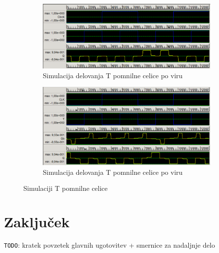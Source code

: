 \documentclass[a4paper, 11pt]{article}
\newcommand{\todo}{\textcolor{BrickRed}{\texttt{TODO}}} %
\begin{document}
\begin{figure}[h!]
	\begin{subfigure}[b]{\textwidth}
	\includegraphics[width=\textwidth]{../img/vir_4/sim_t.png}
	\caption{Simulacija delovanja T pomnilne celice po viru \cite{quantum_dot}}
	\label{fig-t-1-sim}
	\end{subfigure}
	\begin{subfigure}[b]{\textwidth}
	\includegraphics[width=\textwidth]{../img/vir_5/sim_t.png}
	\caption{Simulacija delovanja T pomnilne celice po viru \cite{a_novel_approach}}
	\label{fig-t-2-sim}
	\end{subfigure}
	\caption{Simulaciji T pomnilne celice}
	\label{fig-t-sim}
\end{figure}

\section{Zaključek}
\todo: kratek povzetek glavnih ugotovitev + smernice za nadaljnje delo


 
\end{document}
